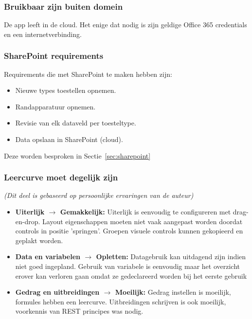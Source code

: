 
\subsubsection{Bruikbaar zijn buiten domein}

De app leeft in de cloud. Het enige dat nodig is zijn geldige Office 365 credentials en een internetverbinding.

\subsubsection{SharePoint requirements}

Requirements die met SharePoint te maken hebben zijn:
\begin{itemize}
    \item Nieuwe types toestellen opnemen.
    \item Randapparatuur opnemen.
    \item Revisie van elk dataveld per toesteltype.
    \item Data opslaan in SharePoint (cloud).
\end{itemize}
Deze worden besproken in Sectie~\ref{sec:sharepoint}

\subsubsection{Leercurve moet degelijk zijn}
\textit{(Dit deel is gebaseerd op persoonlijke ervaringen van de auteur)}

\begin{itemize}
    \item \textbf{Uiterlijk $\rightarrow$ Gemakkelijk:} Uiterlijk is eenvoudig te configureren met drag-en-drop. Layout eigenschappen moeten niet vaak aangepast worden doordat controls in positie 'springen'. Groepen visuele controls kunnen gekopieerd en geplakt worden.
    \item \textbf{Data en variabelen $\rightarrow$ Opletten:} Datagebruik kan uitdagend zijn indien niet goed ingepland. Gebruik van variabele is eenvoudig maar het overzicht erover kan verloren gaan omdat ze gedeclareerd worden bij het eerste gebruik
    \item \textbf{Gedrag en uitbreidingen $\rightarrow$ Moeilijk:} Gedrag instellen is moeilijk, formules hebben een leercurve. Uitbreidingen schrijven is ook moeilijk, voorkennis van REST principes was nodig.
\end{itemize}

